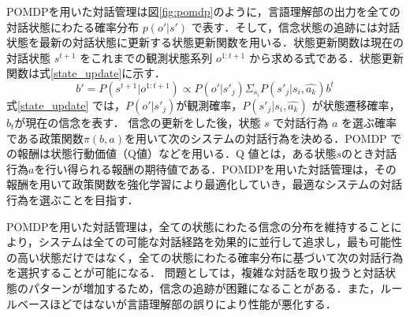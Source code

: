 POMDPを用いた対話管理は図\ref{fig:pomdp}のように，言語理解部の出力を全ての対話状態にわたる確率分布 $p(o'|s')$ で表す．そして，信念状態の追跡には対話状態を最新の対話状態に更新する状態更新関数を用いる．状態更新関数は現在の対話状態 $s^{t+1}$ をこれまでの観測状態系列 $o^{1:t+1}$ から求める式である．状態更新関数は式\ref{state_update}に示す．
\begin{equation}
  \label{state_update}
  b' = P\left(s^{t+1}|o^{1:t+1}\right) \propto P\left(o'|s'_{j}\right) \Sigma_{s_i} P\left(s'_{j}|s_i, \widehat{a_k}\right)b^t
\end{equation}
式\ref{state_update} では，$P(o'|s'_j)$が観測確率，$P(s'_j|s_i,\widehat{a_k})$ が状態遷移確率，$b_t$が現在の信念を表す．
信念の更新をした後，状態 $s$ で対話行為 $a$ を選ぶ確率である政策関数$\pi (b,a)$を用いて次のシステムの対話行為を決める．POMDP での報酬は状態行動価値（Q値）などを用いる．Q 値とは，ある状態$s$のとき対話行為$a$を行い得られる報酬の期待値である．POMDPを用いた対話管理は，その報酬を用いて政策関数を強化学習により最適化していき，最適なシステムの対話行為を選ぶことを目指す．
\par
POMDPを用いた対話管理は，全ての状態にわたる信念の分布を維持することにより，システムは全ての可能な対話経路を効果的に並行して追求し，最も可能性の高い状態だけではなく，全ての状態にわたる確率分布に基づいて次の対話行為を選択することが可能になる\cite{pomdp_review}．
問題としては，複雑な対話を取り扱うと対話状態のパターンが増加するため，信念の追跡が困難になることがある．また，ルールベースほどではないが言語理解部の誤りにより性能が悪化する．